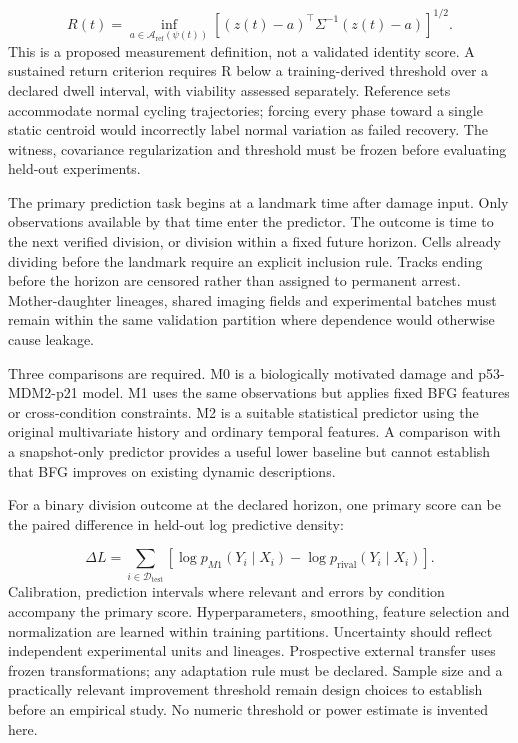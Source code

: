 \documentclass[11pt,a4paper]{article}
\begin{document}
\begin{equation}R(t)=\inf_{a\in\mathcal A_{\mathrm{ref}}(\psi(t))}\left[(z(t)-a)^\top\Sigma^{-1}(z(t)-a)\right]^{1/2}.\tag{14}\end{equation}
This is a proposed measurement definition, not a validated identity score. A sustained return criterion requires R below a training-derived threshold over a declared dwell interval, with viability assessed separately. Reference sets accommodate normal cycling trajectories; forcing every phase toward a single static centroid would incorrectly label normal variation as failed recovery. The witness, covariance regularization and threshold must be frozen before evaluating held-out experiments.

The primary prediction task begins at a landmark time after damage input. Only observations available by that time enter the predictor. The outcome is time to the next verified division, or division within a fixed future horizon. Cells already dividing before the landmark require an explicit inclusion rule. Tracks ending before the horizon are censored rather than assigned to permanent arrest. Mother-daughter lineages, shared imaging fields and experimental batches must remain within the same validation partition where dependence would otherwise cause leakage.

Three comparisons are required. M0 is a biologically motivated damage and p53-MDM2-p21 model. M1 uses the same observations but applies fixed BFG features or cross-condition constraints. M2 is a suitable statistical predictor using the original multivariate history and ordinary temporal features. A comparison with a snapshot-only predictor provides a useful lower baseline but cannot establish that BFG improves on existing dynamic descriptions.

For a binary division outcome at the declared horizon, one primary score can be the paired difference in held-out log predictive density:

\begin{equation}\Delta L=\sum_{i\in\mathcal D_{\mathrm{test}}}\left[\log p_{M1}(Y_i\mid X_i)-\log p_{\mathrm{rival}}(Y_i\mid X_i)\right].\tag{15}\end{equation}
Calibration, prediction intervals where relevant and errors by condition accompany the primary score. Hyperparameters, smoothing, feature selection and normalization are learned within training partitions. Uncertainty should reflect independent experimental units and lineages. Prospective external transfer uses frozen transformations; any adaptation rule must be declared. Sample size and a practically relevant improvement threshold remain design choices to establish before an empirical study. No numeric threshold or power estimate is invented here.
\end{document}
